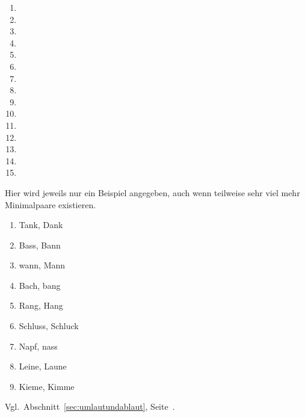 \label{sol:phonetik03}

\begin{enumerate}
  \item {} 
  \item \textipa{[ni:z@n]}
  \item \textipa{[vIs@n]}
  \item {}
  \item \textipa{[defini\t{ts}Jo:n]}
  \item \textipa{[f5P\t{aE}nsh\t{aO}s]}
  \item \textipa{[kl\t{aE}nI\c{c}k\t{aE}t]}
  \item \textipa{[za:n@t\t{O@}t@]}
  \item \textipa{[hu:st@nzaft]}
  \item \textipa{[Po:n@]}
  \item \textipa{[b@StImUN]}
  \item \textipa{[tu:X]}
  \item \textipa{[SUps@n]}
  \item \textipa{[b\t{E@}\c{c}@n]}
  \item {}
\end{enumerate}


\label{sol:phonologie01}

Hier wird jeweils nur ein Beispiel angegeben, auch wenn teilweise sehr viel mehr Minimalpaare existieren.

\begin{enumerate}
  \item Tank, Dank
  \item Bass, Bann
  \item wann, Mann
  \item Bach, bang
  \item Rang, Hang
  \item Schluss, Schluck
  \item Napf, nass
  \item Leine, Laune
  \item Kieme, Kimme
\end{enumerate}

\label{sol:phonologie02}

Vgl.\ Abschnitt~\ref{sec:umlautundablaut}, Seite~\pageref{sec:umlautundablaut}.

\label{sol:phonologie03}

